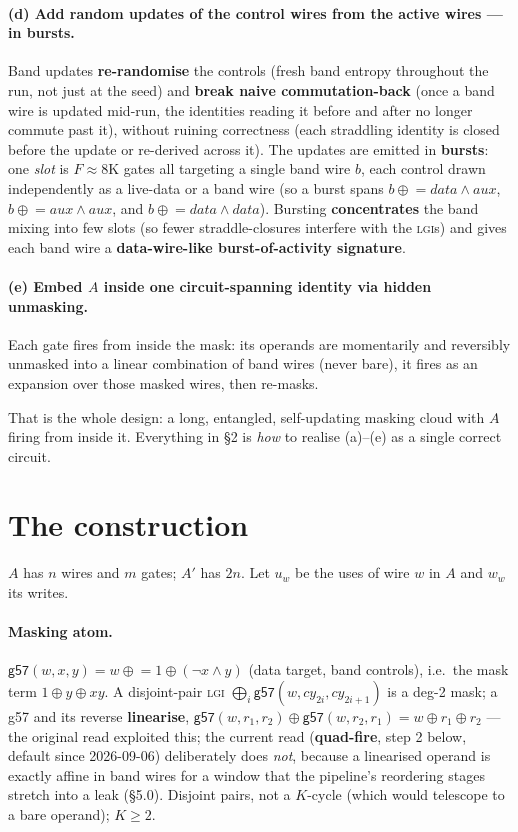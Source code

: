 \documentclass[11pt]{article}
\newcommand{\g}{\textsf{g57}}
\newcommand{\xor}{\oplus}
\newcommand{\lgi}{\textsc{lgi}}
\begin{document}
\paragraph{(d) Add random updates of the control wires from the active wires ---
in bursts.} Band updates \textbf{re-randomise} the controls (fresh band entropy
throughout the run, not just at the seed) and \textbf{break naive commutation-back}
(once a band wire is updated mid-run, the identities reading it before and after no
longer commute past it), without ruining correctness (each straddling identity is
closed before the update or re-derived across it). The updates are emitted in
\textbf{bursts}: one \emph{slot} is $F \approx 8\mathrm{K}$ gates all targeting a
single band wire $b$, each control drawn independently as a live-data or a band wire
(so a burst spans $b \mathrel{\xor}= \mathit{data} \land \mathit{aux}$, $b
\mathrel{\xor}= \mathit{aux} \land \mathit{aux}$, and $b \mathrel{\xor}= \mathit{data}
\land \mathit{data}$). Bursting \textbf{concentrates} the band mixing into few slots
(so fewer straddle-closures interfere with the \lgi s) and gives each band wire a
\textbf{data-wire-like burst-of-activity signature}.

\paragraph{(e) Embed $A$ inside one circuit-spanning identity via hidden
unmasking.} Each gate fires from inside the mask: its operands are momentarily and
reversibly unmasked into a linear combination of band wires (never bare), it fires
as an expansion over those masked wires, then re-masks.

That is the whole design: a long, entangled, self-updating masking cloud with $A$
firing from inside it. Everything in \S2 is \emph{how} to realise (a)--(e) as a
single correct circuit.

\section{The construction}

$A$ has $n$ wires and $m$ gates; $A'$ has $2n$. Let $u_w$ be the uses of wire $w$
in $A$ and $w_w$ its writes.

\paragraph{Masking atom.} $\g(w,x,y) = w \mathrel{\xor}= 1 \xor (\lnot x \land y)$
(data target, band controls), i.e.\ the mask term $1 \xor y \xor xy$. A
disjoint-pair \lgi{} $\bigoplus_i \g(w, cy_{2i}, cy_{2i+1})$ is a deg-2 mask; a \g{}
and its reverse \textbf{linearise}, $\g(w,r_1,r_2) \xor \g(w,r_2,r_1) = w \xor r_1
\xor r_2$ --- the original read exploited this; the current read
(\textbf{quad-fire}, step 2 below, default since 2026-09-06) deliberately does
\emph{not}, because a linearised operand is exactly affine in band wires for a window
that the pipeline's reordering stages stretch into a leak (\S5.0). Disjoint pairs,
not a $K$-cycle (which would telescope to a bare operand); $K \ge 2$.
\end{document}
